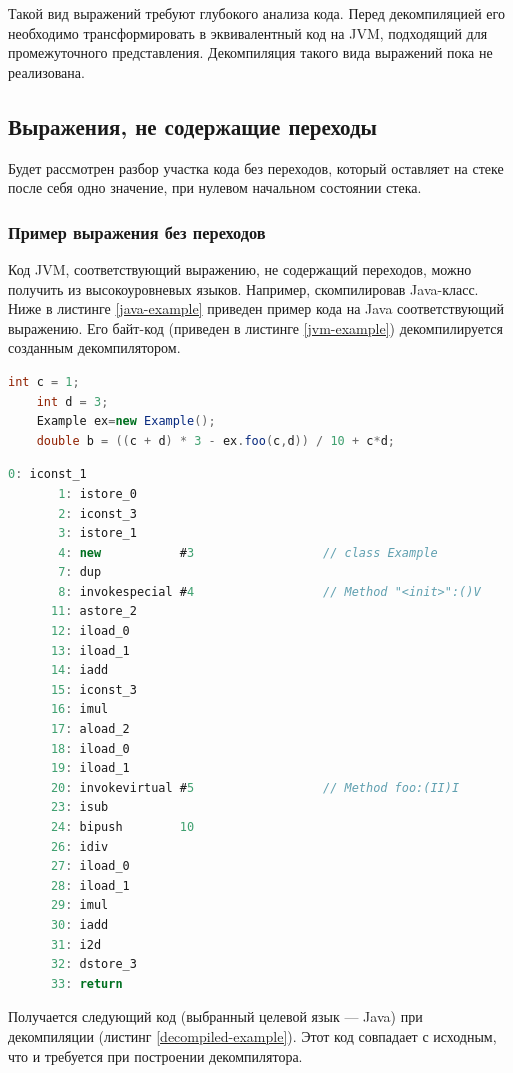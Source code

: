 Такой вид выражений требуют глубокого анализа кода. Перед декомпиляцией его необходимо трансформировать в эквивалентный код на JVM, подходящий для промежуточного представления. Декомпиляция такого вида выражений пока не реализована. 

\subsection{Выражения, не содержащие переходы}
Будет рассмотрен разбор участка кода без переходов, который оставляет на стеке после себя одно значение, при нулевом начальном состоянии стека. 

\subsubsection*{Пример выражения без переходов}
Код JVM, соответствующий выражению, не содержащий переходов, можно получить из высокоуровневых языков. Например, скомпилировав Java-класс. Ниже в листинге \ref{java-example} приведен пример кода на Java соответствующий выражению. Его байт-код (приведен в листинге \ref{jvm-example}) декомпилируется созданным декомпилятором. 

\begin{lstlisting}[label=java-example,caption = Пример кода выражения в Java без переходов, frame = single, language = JAVA]
	int c = 1; 
 	int d = 3; 
	Example ex=new Example();
 	double b = ((c + d) * 3 - ex.foo(c,d)) / 10 + c*d; 
\end{lstlisting}

\begin{lstlisting}[label=jvm-example,caption = Пример кода выражения в JVM без переходов, frame = single, language = JAVA]
       0: iconst_1
       1: istore_0
       2: iconst_3
       3: istore_1
       4: new           #3                  // class Example
       7: dup
       8: invokespecial #4                  // Method "<init>":()V
      11: astore_2
      12: iload_0
      13: iload_1
      14: iadd
      15: iconst_3
      16: imul
      17: aload_2
      18: iload_0
      19: iload_1
      20: invokevirtual #5                  // Method foo:(II)I
      23: isub
      24: bipush        10
      26: idiv
      27: iload_0
      28: iload_1
      29: imul
      30: iadd
      31: i2d
      32: dstore_3
      33: return
\end{lstlisting}

Получается следующий код (выбранный целевой язык --- Java) при декомпиляции (листинг \ref{decompiled-example}). Этот код совпадает с исходным, что и требуется при построении декомпилятора.


